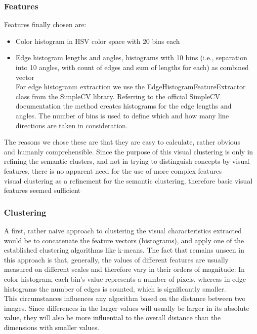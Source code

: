 \subsubsection{Features}
Features finally chosen are:
\begin{itemize}
\item{Color histogram} in HSV color space with 20 bins each
\item{Edge histogram} lengths and angles, histograms with 10 bins (i.e., separation into 10 angles, with count of edges and sum of lengths for each) as combined vector 
\\
For edge histogranm extraction we use the EdgeHistogramFeatureExtractor class from the SimpleCV library. Referring to the official SimpleCV documentation   the method creates histograms for the edge lengths and angles. The number of bins is used to define which and how many line directions are taken in consideration.  
\end{itemize}
The reasons we chose these are that they are easy to calculate, rather obvious and humanly comprehensible. Since the purpose of this visual clustering is only in refining the semantic clusters, and not in trying to distinguish concepts by visual features, there is no apparent need for the use of more complex features \\
visual clustering as a refinement for the semantic clustering, therefore basic visual features seemed sufficient 


\subsubsection{Clustering}
A first, rather naive approach to clustering the visual characteristics extracted would be to concatenate the feature vectors (histograms), and apply one of the established clustering algorithms like k-means.  The fact that remains unseen in this approach is that, generally, the values of different features are usually measured on different scales and therefore vary in their orders of magnitude: In color histogram, each bin's value represents a number of pixels, whereas in edge histograms the number of edges is counted, which is significantly smaller. \\
This circumstances influences any algorithm based on the distance between two images. Since differences in the larger values will usually be larger in its absolute value, they will also be more influential to the overall distance than the dimensions with smaller values.

